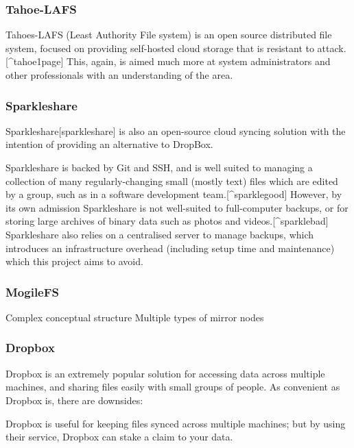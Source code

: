 \documentclass[12pt,a4paper,]{book}
\begin{document}
\subsubsection{Tahoe-LAFS}\label{tahoe-lafs}

Tahoes-LAFS (Least Authority File system) is an open source distributed
file system, focused on providing self-hosted cloud storage that is
resistant to attack.{[}\^{}tahoe1page{]} This, again, is aimed much more
at system administrators and other professionals with an understanding
of the area.

\subsubsection{Sparkleshare}\label{sparkleshare}

Sparkleshare{[}sparkleshare{]} is also an open-source cloud syncing
solution with the intention of providing an alternative to DropBox.

Sparkleshare is backed by Git and SSH, and is well suited to managing a
collection of many regularly-changing small (mostly text) files which
are edited by a group, such as in a software development
team.{[}\^{}sparklegood{]} However, by its own admission Sparkleshare is
not well-suited to full-computer backups, or for storing large archives
of binary data such as photos and videos.{[}\^{}sparklebad{]}
Sparkleshare also relies on a centralised server to manage backups,
which introduces an infrastructure overhead (including setup time and
maintenance) which this project aims to avoid.

\subsubsection{MogileFS}\label{mogilefs}

Complex conceptual structure Multiple types of mirror nodes

\subsubsection{Dropbox}\label{dropbox}

Dropbox is an extremely popular solution for accessing data across
multiple machines, and sharing files easily with small groups of people.
As convenient as Dropbox is, there are downsides:

Dropbox is useful for keeping files synced across multiple machines; but
by using their service, Dropbox can stake a claim to your data.
\end{document}
